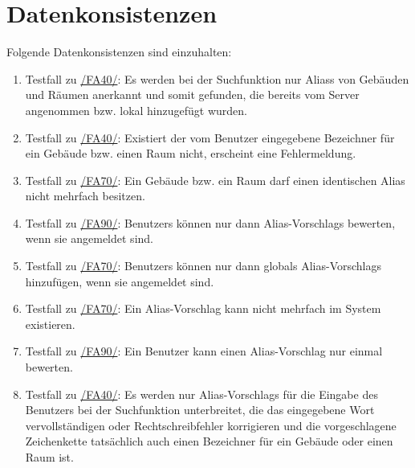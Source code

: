 \section{Datenkonsistenzen}

Folgende Datenkonsistenzen sind einzuhalten:
\begin{enumerate}[label=\textbf{/T\arabic*0/}, align=left, resume]
	\item \label{/T300/} Testfall zu \hyperref[/FA40/]{/FA40/}: Es werden bei der Suchfunktion nur \Glspl{Alias} von Gebäuden und Räumen anerkannt und somit gefunden, die bereits vom \Gls{Server} angenommen bzw. \gls{lokal} hinzugefügt wurden.
	\item \label{/T310/} Testfall zu \hyperref[/FA40/]{/FA40/}: Existiert der vom \Gls{Benutzer} eingegebene Bezeichner für ein Gebäude bzw. einen Raum nicht, erscheint eine Fehlermeldung.
	\item \label{/T320/} Testfall zu \hyperref[/FA70/]{/FA70/}: Ein Gebäude bzw. ein Raum darf einen identischen Alias nicht mehrfach besitzen.
	\item \label{/T330/} Testfall zu \hyperref[/FA90/]{/FA90/}: \Glspl{Benutzer} können nur dann \Glspl{Alias-Vorschlag} bewerten, wenn sie angemeldet sind.
	\item \label{/T340/} Testfall zu \hyperref[/FA70/]{/FA70/}: \Glspl{Benutzer} können nur dann \glspl{global} \Glspl{Alias-Vorschlag} hinzufügen, wenn sie angemeldet sind.
	\item \label{/T350/} Testfall zu \hyperref[/FA70/]{/FA70/}: Ein \Gls{Alias-Vorschlag} kann nicht mehrfach im System existieren.
	\item \label{/T360/} Testfall zu \hyperref[/FA90/]{/FA90/}: Ein \Gls{Benutzer} kann einen \Gls{Alias-Vorschlag} nur einmal bewerten.
	\item \label{/T370/} Testfall zu \hyperref[/FA40/]{/FA40/}: Es werden nur \Glspl{Alias-Vorschlag} für die Eingabe des \Gls{Benutzer}s bei der Suchfunktion unterbreitet, die das eingegebene Wort vervollständigen oder Rechtschreibfehler korrigieren und die vorgeschlagene Zeichenkette tatsächlich auch einen Bezeichner für ein Gebäude oder einen Raum ist.
\end{enumerate}